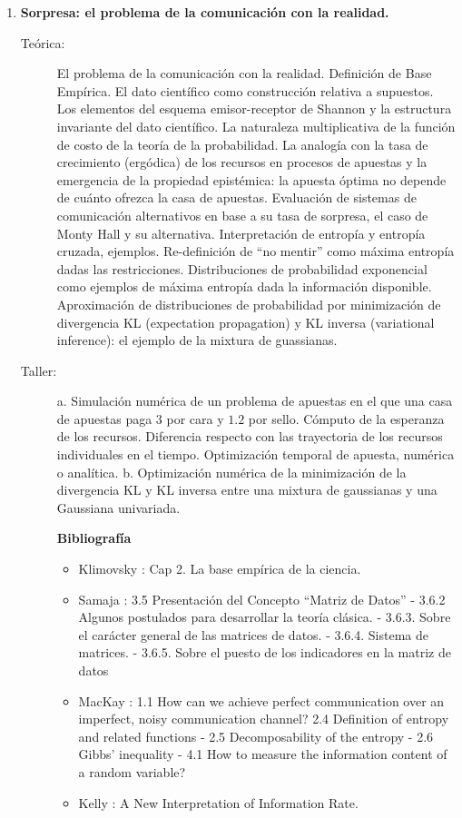 \documentclass[10pt]{article}
\begin{document}
\begin{enumerate}
\item \textbf{Sorpresa: el problema de la comunicación con la realidad.}
\vspace{-0.15cm}
\begin{description}
\item[Teórica:]
El problema de la comunicación con la realidad.
Definición de Base Empírica.
El dato científico como construcción relativa a supuestos.
Los elementos del esquema emisor-receptor de Shannon y la estructura invariante del dato científico.
La naturaleza multiplicativa de la función de costo de la teoría de la probabilidad.
La analogía con la tasa de crecimiento (ergódica) de los recursos en procesos de apuestas y la emergencia de la propiedad epistémica: la apuesta óptima no depende de cuánto ofrezca la casa de apuestas.
Evaluación de sistemas de comunicación alternativos en base a su tasa de sorpresa, el caso de Monty Hall y su alternativa.
Interpretación de entropía y entropía cruzada, ejemplos.
Re-definición de ``no mentir'' como máxima entropía dadas las restricciones.
Distribuciones de probabilidad exponencial como ejemplos de máxima entropía dada la información disponible.
Aproximación de distribuciones de probabilidad por minimización de divergencia KL (expectation propagation) y KL inversa (variational inference): el ejemplo de la mixtura de guassianas.
\item[Taller:] a. Simulación numérica de un problema de apuestas en el que una casa de apuestas paga $3$ por cara y $1.2$ por sello. Cómputo de la esperanza de los recursos. Diferencia respecto con las trayectoria de los recursos individuales en el tiempo. Optimización temporal de apuesta, numérica o analítica. b. Optimización numérica de la minimización de la divergencia KL y KL inversa entre una mixtura de gaussianas y una Gaussiana univariada.
\item[] \textbf{Bibliografía}
\begin{itemize}
\item Klimovsky \cite{klimovsky1994-desventuras}: Cap 2. La base empírica de la ciencia.
\item Samaja \cite{samaja1999-epistemologiaMetodologia}: 3.5 Presentación del Concepto ``Matriz de Datos'' - 3.6.2 Algunos postulados para desarrollar la teoría clásica. - 3.6.3. Sobre el carácter general de las matrices de datos. - 3.6.4. Sistema de matrices. - 3.6.5. Sobre el puesto de los indicadores en la matriz de datos
\item MacKay \cite{mackay2003-informationInferenceLearning}: 1.1 How can we achieve perfect communication over an imperfect, noisy communication channel? 2.4 Definition of entropy and related functions - 2.5 Decomposability of the entropy - 2.6 Gibbs' inequality - 4.1 How to measure the information content of a random variable?
\item Kelly \cite{kelly1956-informationRate}: A New Interpretation of Information Rate.
\end{itemize}
\end{description}


\end{enumerate}
\end{document}
